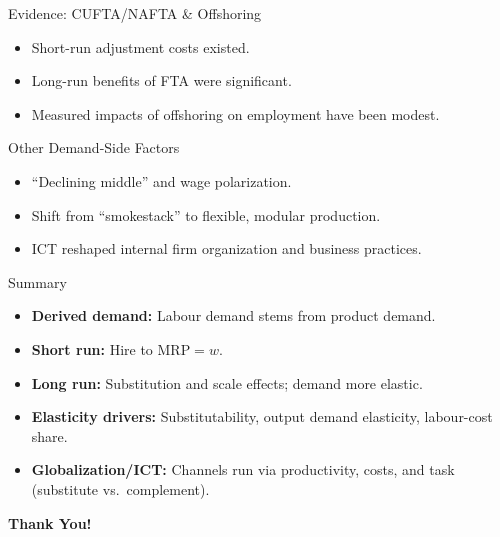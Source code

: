 \documentclass[aspectratio=169]{beamer}
\begin{document}
\begin{frame}{Evidence: CUFTA/NAFTA \& Offshoring}
\transfade
\begin{itemize}[<+->]
  \item Short-run adjustment costs existed.
  \item Long-run benefits of FTA were significant.
  \item Measured impacts of offshoring on employment have been modest.
\end{itemize}
\end{frame}

\begin{frame}{Other Demand-Side Factors}
\transfade
\begin{itemize}[<+->]
  \item “Declining middle” and wage polarization.
  \item Shift from “smokestack” to flexible, modular production.
  \item ICT reshaped internal firm organization and business practices.
\end{itemize}
\end{frame}


\begin{frame}{Summary}
\transfade
\begin{itemize}[<+->]
  \item \textbf{Derived demand:} Labour demand stems from product demand.
  \item \textbf{Short run:} Hire to \( \text{MRP}=w \).
  \item \textbf{Long run:} Substitution and scale effects; demand more elastic.
  \item \textbf{Elasticity drivers:} Substitutability, output demand elasticity, labour-cost share.
  \item \textbf{Globalization/ICT:} Channels run via productivity, costs, and task (substitute vs.\ complement).
\end{itemize}
\end{frame}

\begin{frame}
\centering
\Huge{\textbf{Thank You!}} \\

\end{frame}
\end{document}

